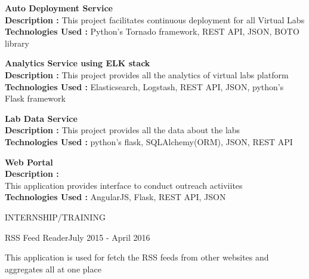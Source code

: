 \documentclass{resume} %
\begin{document}
\bigskip

\textbf{Auto Deployment Service} \\
\textbf{Description :} This project facilitates continuous deployment for all Virtual Labs \\
\textbf{Technologies Used :} Python's Tornado framework, REST API, JSON, BOTO library

\bigskip

\textbf{Analytics Service using ELK stack} \\
\textbf{Description :} This project provides all the analytics of virtual labs platform \\
\textbf{Technologies Used :} Elasticsearch, Logstash, REST API, JSON, python's Flask framework

\bigskip

\textbf{Lab Data Service} \\
\textbf{Description :} This project provides all the data about the labs \\
\textbf{Technologies Used :} python's flask, SQLAlchemy(ORM), JSON, REST API

\bigskip
\textbf{Web Portal} \\
\textbf{Description :} \\
This application provides interface to conduct outreach activiites \\
\textbf{Technologies Used :} AngularJS, Flask, REST API, JSON


\break
\begin{rSection}{INTERNSHIP/TRAINING}

  \begin{rSubsection}
    {RSS Feed Reader}{July 2015 - April 2016}{}{}
  \item This application is used for fetch the RSS feeds from other websites
    and aggregates all at one place
 
  \end{rSubsection} 

\end{rSection} 


\end{document}
